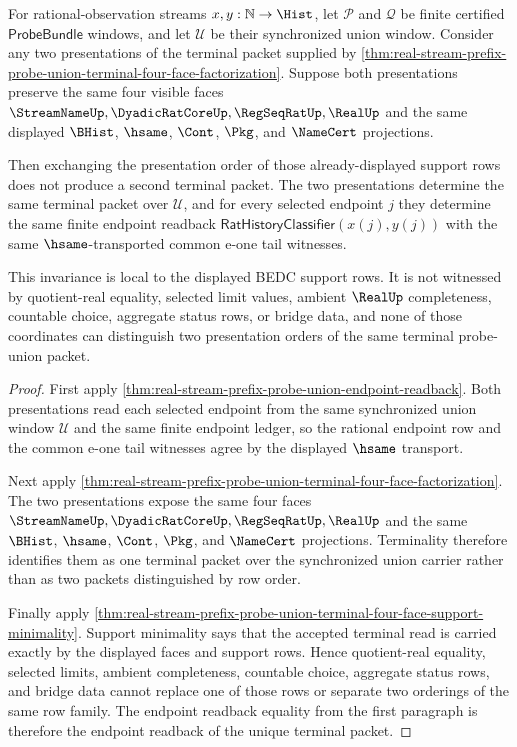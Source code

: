 \begin{theorem}
\label{thm:real-stream-prefix-probe-union-support-row-exchange-invariance}
For rational-observation streams $x,y:\mathbb{N}\to\Hist$, let
$\mathcal P$ and $\mathcal Q$ be finite certified $\mathsf{ProbeBundle}$
windows, and let $\mathcal U$ be their synchronized union window. Consider any
two presentations of the terminal packet supplied by
\autoref{thm:real-stream-prefix-probe-union-terminal-four-face-factorization}.
Suppose both presentations preserve the same four visible faces
$\StreamNameUp,\DyadicRatCoreUp,\RegSeqRatUp,\RealUp$ and the same displayed
$\BHist$, $\hsame$, $\Cont$, $\Pkg$, and $\NameCert$ projections.

Then exchanging the presentation order of those already-displayed support rows
does not produce a second terminal packet. The two presentations determine the
same terminal packet over $\mathcal U$, and for every selected endpoint $j$ they
determine the same finite endpoint readback
$\mathsf{RatHistoryClassifier}(x(j),y(j))$ with the same $\hsame$-transported
common e-one tail witnesses.

This invariance is local to the displayed BEDC support rows. It is not
witnessed by quotient-real equality, selected limit values, ambient
$\RealUp$ completeness, countable choice, aggregate status rows, or bridge
data, and none of those coordinates can distinguish two presentation orders of
the same terminal probe-union packet.
\end{theorem}
\begin{proof}
First apply
\autoref{thm:real-stream-prefix-probe-union-endpoint-readback}. Both
presentations read each selected endpoint from the same synchronized union
window $\mathcal U$ and the same finite endpoint ledger, so the rational
endpoint row and the common e-one tail witnesses agree by the displayed
$\hsame$ transport.

Next apply
\autoref{thm:real-stream-prefix-probe-union-terminal-four-face-factorization}.
The two presentations expose the same four faces
$\StreamNameUp,\DyadicRatCoreUp,\RegSeqRatUp,\RealUp$ and the same
$\BHist$, $\hsame$, $\Cont$, $\Pkg$, and $\NameCert$ projections. Terminality
therefore identifies them as one terminal packet over the synchronized union
carrier rather than as two packets distinguished by row order.

Finally apply
\autoref{thm:real-stream-prefix-probe-union-terminal-four-face-support-minimality}.
Support minimality says that the accepted terminal read is carried exactly by
the displayed faces and support rows. Hence quotient-real equality, selected
limits, ambient completeness, countable choice, aggregate status rows, and
bridge data cannot replace one of those rows or separate two orderings of the
same row family. The endpoint readback equality from the first paragraph is
therefore the endpoint readback of the unique terminal packet.
\end{proof}
